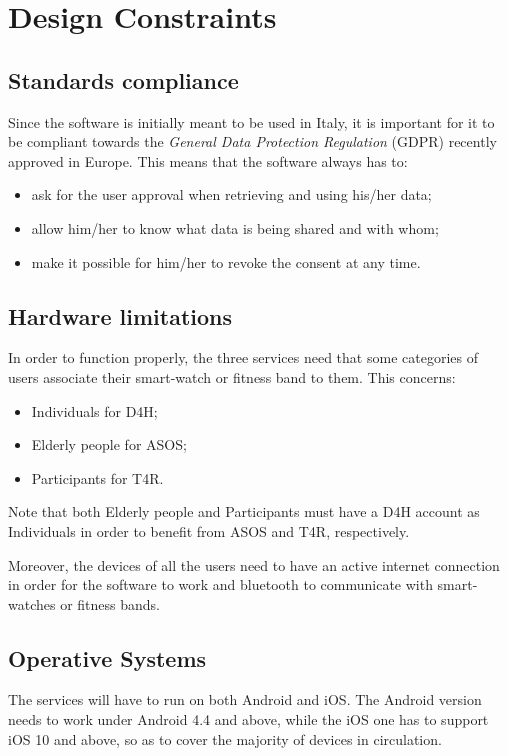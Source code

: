 \section{Design Constraints}
    \subsection{Standards compliance}
        
        Since the software is initially meant to be used in Italy, it is important for it to be compliant towards the \emph{General Data Protection Regulation} (GDPR) recently approved in Europe. This means that the software always has to:
        \begin{itemize}
            \item ask for the user approval when retrieving and using his/her data;
            \item allow him/her to know what data is being shared and with whom;
            \item make it possible for him/her to revoke the consent at any time.
        \end{itemize}
        
    \subsection{Hardware limitations}
    
        In order to function properly, the three services need that some categories of users associate their smart-watch or fitness band to them. This concerns:
        \begin{itemize}
            \item Individuals for D4H;
            \item Elderly people for ASOS;
            \item Participants for T4R.
        \end{itemize}
        Note that both Elderly people and Participants must have a D4H account as Individuals in order to benefit from ASOS and T4R, respectively.
        
        Moreover, the devices of all the users need to have an active internet connection in order for the software to work and bluetooth to communicate with smart-watches or fitness bands.
        
    \subsection{Operative Systems}  \label{OS}
        
        The services will have to run on both Android and iOS. The Android version needs to work under Android 4.4 and above, while the iOS one has to support iOS 10 and above, so as to cover the majority of devices in circulation.